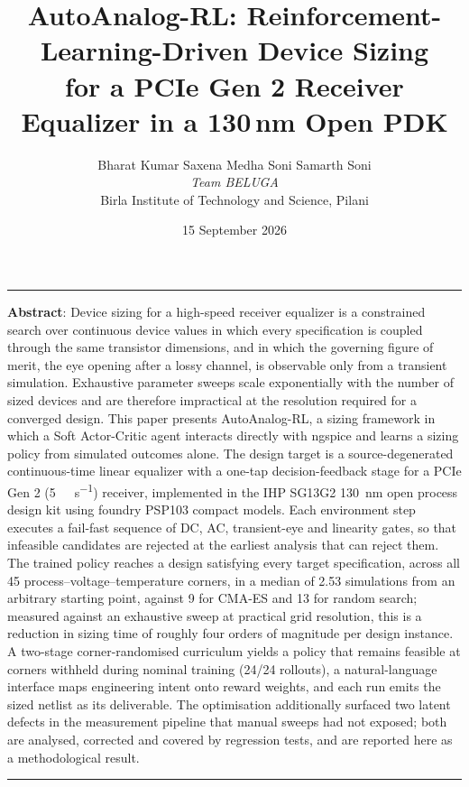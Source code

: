 \documentclass[10pt,a4paper]{article}
\title{\vspace{-10mm}\textbf{\Large AutoAnalog-RL: Reinforcement-Learning-Driven Device Sizing\\[2pt]
for a PCIe Gen 2 Receiver Equalizer in a 130\,nm Open PDK}}
\author{%
  \normalsize Bharat Kumar Saxena \quad Medha Soni \quad Samarth Soni\\[2pt]
  \normalsize \textit{Team BELUGA}\\[1pt]
  \normalsize Birla Institute of Technology and Science, Pilani
}
\date{\normalsize 15 September 2026}
\begin{document}
\maketitle
\vspace{-8mm}

\begin{center}
\begin{minipage}{0.94\textwidth}
\rule{\textwidth}{0.8pt}\vspace{4pt}

\small\textbf{Abstract}: Device sizing for a high-speed receiver equalizer is a
constrained search over continuous device values in which every specification is
coupled through the same transistor dimensions, and in which the governing
figure of merit, the eye opening after a lossy channel, is observable only from a
transient simulation. Exhaustive parameter sweeps scale exponentially with the
number of sized devices and are therefore impractical at the resolution required
for a converged design. This paper presents AutoAnalog-RL, a sizing framework in
which a Soft Actor-Critic agent interacts directly with ngspice and learns a
sizing policy from simulated outcomes alone. The design target is a
source-degenerated continuous-time linear equalizer with a one-tap
decision-feedback stage for a PCIe Gen 2 (\SI{5}{\giga\bit\per\second}) receiver,
implemented in the IHP SG13G2 \SI{130}{\nano\meter} open process design kit using
foundry PSP103 compact models. Each environment step executes a fail-fast
sequence of DC, AC, transient-eye and linearity gates, so that infeasible
candidates are rejected at the earliest analysis that can reject them. The
trained policy reaches a design satisfying every target specification, across all
45 process--voltage--temperature corners, in a median of 2.53 simulations from an
arbitrary starting point, against 9 for CMA-ES and 13 for random search; measured
against an exhaustive sweep at practical grid resolution, this is a reduction in
sizing time of roughly four orders of magnitude per design instance. A two-stage
corner-randomised curriculum yields a policy that remains feasible at
corners withheld during nominal training (24/24 rollouts), a natural-language
interface maps engineering intent onto reward weights, and each run emits the
sized netlist as its deliverable. The optimisation additionally surfaced two
latent defects in the measurement pipeline that manual sweeps had not exposed;
both are analysed, corrected and covered by regression tests, and are reported
here as a methodological result.

\vspace{4pt}\rule{\textwidth}{0.8pt}
\end{minipage}
\end{center}
\end{document}
